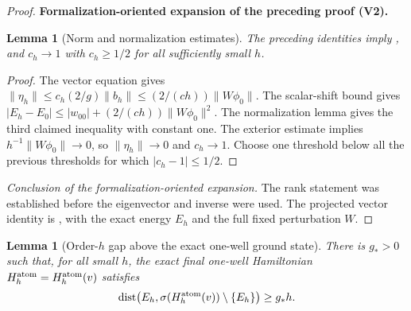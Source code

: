\documentclass[11pt]{article}
\newtheorem{lemma}[theorem]{Lemma}
\newcommand{\formalisationparentid}{X}
\newenvironment{formalisationaddition}[1]{\par\medskip\begingroup\color{blue}\def\formalisationparentid{#1}\setcounter{formalizationsublemma}{0}\let\lemma\formalizationsublemma\let\endlemma\endformalizationsublemma
  \def\Eo{\mathcal E_h^\circ}\def\EE{\mathcal E_h}\def\phio{\phi_h^\circ}\def\phih{\phi_h}\def\Ho{H_h^{\rm atom}(v^\circ)}\def\Ha{H_h^{\rm atom}}\def\HL{H_h^{L}}\def\Dh{D_h}\def\Log{\operatorname{Log}}\def\ellh{\ell_h}\def\Gp{G_{p,h}}\def\Ast{A_{*,h}}\def\ahat{\widehat{\mathfrak a}_h}\def\ah{\mathfrak a_h}\def\rh{\widehat\rho_h}\def\deltah{\widehat\delta_h}\def\oldref##1{\textup{(##1)}}\def\interface##1{\par\noindent\textit{Analytical interface used here.} ##1\par}\def\finish{\par\noindent\textit{Conclusion of the formalization-oriented expansion.} }\par\noindent\textbf{Formalization-oriented expansion of the preceding proof (V2).}\par\smallskip
}{\par\endgroup\medskip
}
\newcommand{\dist}{\operatorname{dist}}
\begin{document}
\begin{proof}
\begin{formalisationaddition}{P3.2}
\begin{lemma}[Norm and normalization estimates]\label{sublemma:P3-2-estimates}
The preceding identities imply ,
and $c_h\to1$ with $c_h\ge1/2$ for all sufficiently small $h$.
\end{lemma}
\begin{proof}
The vector equation gives
$\|\eta_h\|\le c_h(2/g)\|b_h\|\le(2/(ch))\|W\phi_0\|$.
The scalar-shift bound gives
$|E_h-E_0|\le|w_{00}|+(2/(ch))\|W\phi_0\|^2$.
The normalization lemma gives the third claimed inequality with constant
one. The exterior estimate implies $h^{-1}\|W\phi_0\|\to0$, so
$\|\eta_h\|\to0$ and $c_h\to1$. Choose one threshold below all the
previous thresholds for which $|c_h-1|\le1/2$.
\end{proof}
\finish The rank statement was established before the eigenvector and
inverse were used. The projected vector identity is
, with the exact energy $E_h$ and the full fixed
perturbation $W$.
\end{formalisationaddition}

\end{proof}

\begin{lemma}[Order-$h$ gap above the exact one-well ground state]
\label{lem:exact-one-well-gap}
There is $g_*>0$ such that, for all small $h$, the exact final one-well
Hamiltonian $H_h^{\rm atom}=H_h^{\rm atom}(v)$ satisfies
\begin{equation}\label{eq:exact-one-well-gap}
 \dist\!\left(E_h,\sigma(H_h^{\rm atom}(v))\setminus\{E_h\}\right)
 \ge g_*h.
\end{equation}
\end{lemma}
\end{document}
